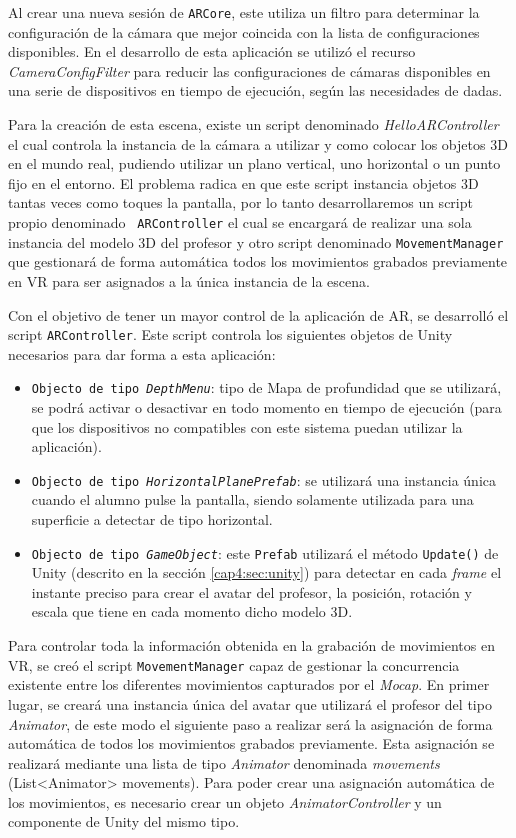 Al crear una nueva sesión de \texttt{ARCore}, este utiliza un filtro para determinar la configuración de la cámara que mejor coincida con la lista de configuraciones disponibles. En el desarrollo de esta aplicación se utilizó el recurso \textit{CameraConfigFilter} para reducir las configuraciones de cámaras disponibles en una serie de dispositivos en tiempo de ejecución, según las necesidades de dadas.

Para la creación de esta escena, existe un script denominado \textit{HelloARController} el cual controla la instancia de la cámara a utilizar y como colocar los objetos 3D en el mundo real, pudiendo utilizar un plano vertical, uno horizontal o un punto fijo en el entorno. El problema radica en que este script instancia objetos 3D tantas veces como toques la pantalla, por lo tanto desarrollaremos un script propio denominado \texttt{ ARController} el cual se encargará de realizar una sola instancia del modelo 3D del profesor y otro script denominado \texttt{MovementManager} que gestionará de forma automática todos los movimientos grabados previamente en VR para ser asignados a la única instancia de la escena.

Con el objetivo de tener un mayor control de la aplicación de AR, se desarrolló el script \texttt{ARController}. Este script controla los siguientes objetos de Unity necesarios para dar forma a esta aplicación:

\begin{itemize}
    \item \texttt{Objecto de tipo \textit{DepthMenu}}: tipo de Mapa de profundidad que se utilizará, se podrá activar o desactivar en todo momento en tiempo de ejecución (para que los dispositivos no compatibles con este sistema puedan utilizar la aplicación).
    \item \texttt{Objecto de tipo \textit{HorizontalPlanePrefab}}: se utilizará una instancia única cuando el alumno pulse la pantalla, siendo solamente utilizada para una superficie a detectar de tipo horizontal.
    \item \texttt{Objecto de tipo \textit{GameObject}}: este \texttt{Prefab} utilizará el método \texttt{Update()} de Unity (descrito en la sección \ref{cap4:sec:unity}) para detectar en cada \textit{frame} el instante preciso para crear el avatar del profesor, la posición, rotación y escala que tiene en cada momento dicho modelo 3D.
\end{itemize}

Para controlar toda la información obtenida en la grabación de movimientos en VR, se creó el script \texttt{MovementManager} capaz de gestionar la concurrencia existente entre los diferentes movimientos capturados por el \textit{Mocap}. En primer lugar, se creará una instancia única del avatar que utilizará el profesor del tipo \textit{Animator}, de este modo el siguiente paso a realizar será la asignación de forma automática de todos los movimientos grabados previamente. Esta asignación se realizará mediante una lista de tipo \textit{Animator} denominada \textit{movements} (List<Animator> movements). Para poder crear una asignación automática de los movimientos, es necesario crear un objeto \textit{AnimatorController} y un componente de Unity del mismo tipo. 


